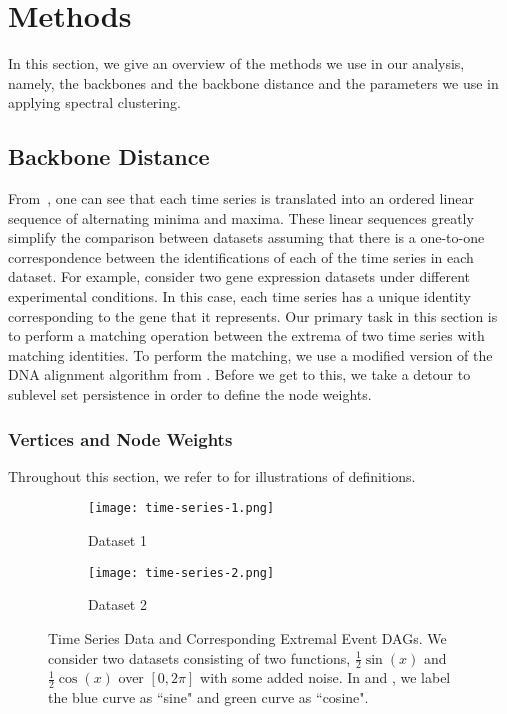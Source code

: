 \section{Methods}

In this section, we give an overview of the methods we use in our analysis, namely, the backbones and the backbone distance and the parameters we use in applying spectral clustering.

\subsection{Backbone Distance}

From~, one can see that each time series is translated
into an ordered linear sequence of alternating minima and maxima. These linear
sequences greatly simplify the comparison between datasets assuming that 
there is a one-to-one correspondence between the identifications of each of the time series
in each dataset. For example, consider two
gene expression datasets under different experimental conditions. In this case,
each time series has a unique identity corresponding to the gene that it
represents. Our primary task in this section is to perform a matching operation
between the extrema of two time series with matching identities. To perform the
matching, we use a modified version of the DNA alignment algorithm from
\cite{NeedlemanA70}. Before we get to this, we take a detour to sublevel set persistence 
in order to define the node weights.

\subsubsection{Vertices and Node Weights}

Throughout this section, we refer to
 for illustrations of definitions.

\begin{figure}[htp]
     \centering
     \begin{subfigure}[b]{0.4\textwidth}
         \centering
         \texttt{[image: time-series-1.png]}
         \caption{Dataset 1}
         \label{fig:timeseries1}
     \end{subfigure}
     \hfill
     \begin{subfigure}[b]{0.4\textwidth}
         \centering
         \texttt{[image: time-series-2.png]}
         \caption{Dataset 2}
         \label{fig:timeseries2}
     \end{subfigure} 

        \caption{Time Series Data and Corresponding Extremal Event DAGs. We consider two datasets consisting of two functions, $\frac{1}{2}\sin(x)$ and
        $\frac{1}{2}\cos(x)$ over $[0, 2\pi]$ with some added noise. In
         and , we label the blue curve
        as ``sine" and green curve as ``cosine". }        
        \label{fig:time-series-and-dags}
\end{figure}

